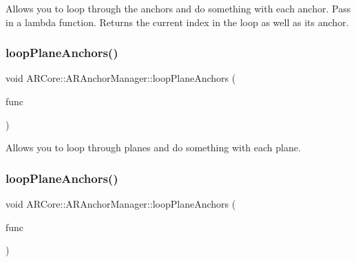 Allows you to loop through the anchors and do something with each anchor. Pass in a lambda function. Returns the current index in the loop as well as it\textquotesingle{}s anchor. \mbox{\label{class_a_r_core_1_1_a_r_anchor_manager_a170e30f7226b84eaede22392f08d5521}} 
\subsubsection{\texorpdfstring{loop\+Plane\+Anchors()}{loopPlaneAnchors()}\hspace{0.1cm}{\footnotesize\ttfamily [1/2]}}
{\footnotesize\ttfamily void A\+R\+Core\+::\+A\+R\+Anchor\+Manager\+::loop\+Plane\+Anchors (\begin{DoxyParamCaption}\item[{std\+::function$<$ void(\mbox{\hyperlink{struct_a_r_objects_1_1_plane_anchor_object}{Plane\+Anchor\+Object}})$>$}]{func }\end{DoxyParamCaption})}



Allows you to loop through planes and do something with each plane. 

\mbox{\label{class_a_r_core_1_1_a_r_anchor_manager_a6f3215e085a92b1165b3da58138adbfc}} 
\subsubsection{\texorpdfstring{loop\+Plane\+Anchors()}{loopPlaneAnchors()}\hspace{0.1cm}{\footnotesize\ttfamily [2/2]}}
{\footnotesize\ttfamily void A\+R\+Core\+::\+A\+R\+Anchor\+Manager\+::loop\+Plane\+Anchors (\begin{DoxyParamCaption}\item[{std\+::function$<$ void(\mbox{\hyperlink{struct_a_r_objects_1_1_plane_anchor_object}{Plane\+Anchor\+Object}}, int index)$>$}]{func }\end{DoxyParamCaption})}



